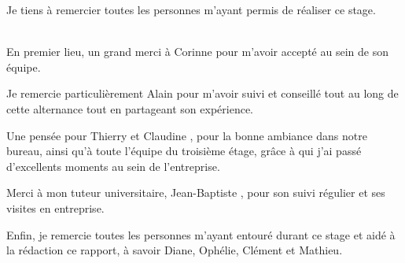 Je tiens à remercier toutes les personnes m'ayant permis de réaliser ce stage.\\~

En premier lieu, un grand merci à Corinne  pour m'avoir accepté au sein de son équipe.

Je remercie particulièrement Alain  pour m'avoir suivi et conseillé tout au long de cette alternance tout en partageant son expérience.

Une pensée pour Thierry  et Claudine , pour la bonne ambiance dans notre bureau, ainsi qu'à toute l'équipe du troisième étage, grâce à qui j'ai passé d'excellents moments au sein de l'entreprise.

Merci à mon tuteur universitaire, Jean-Baptiste , pour son suivi régulier et ses visites en entreprise.

Enfin, je remercie toutes les personnes m'ayant entouré durant ce stage et aidé à la rédaction ce rapport, à savoir Diane, Ophélie, Clément et Mathieu.
